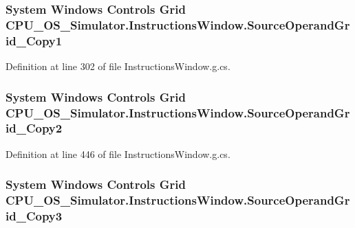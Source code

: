\subsubsection[{Source\+Operand\+Grid\+\_\+\+Copy1}]{\setlength{\rightskip}{0pt plus 5cm}System Windows Controls Grid C\+P\+U\+\_\+\+O\+S\+\_\+\+Simulator.\+Instructions\+Window.\+Source\+Operand\+Grid\+\_\+\+Copy1\hspace{0.3cm}{\ttfamily [package]}}\label{class_c_p_u___o_s___simulator_1_1_instructions_window_a685393ff28189e8c998e2a7dc6018b32}


Definition at line 302 of file Instructions\+Window.\+g.\+cs.

\hypertarget{class_c_p_u___o_s___simulator_1_1_instructions_window_a6a57e0ae92b85cd619ef3d879ef0c628}{}
\subsubsection[{Source\+Operand\+Grid\+\_\+\+Copy2}]{\setlength{\rightskip}{0pt plus 5cm}System Windows Controls Grid C\+P\+U\+\_\+\+O\+S\+\_\+\+Simulator.\+Instructions\+Window.\+Source\+Operand\+Grid\+\_\+\+Copy2\hspace{0.3cm}{\ttfamily [package]}}\label{class_c_p_u___o_s___simulator_1_1_instructions_window_a6a57e0ae92b85cd619ef3d879ef0c628}


Definition at line 446 of file Instructions\+Window.\+g.\+cs.

\hypertarget{class_c_p_u___o_s___simulator_1_1_instructions_window_ac37123264ae139f4abc30841da21cd23}{}
\subsubsection[{Source\+Operand\+Grid\+\_\+\+Copy3}]{\setlength{\rightskip}{0pt plus 5cm}System Windows Controls Grid C\+P\+U\+\_\+\+O\+S\+\_\+\+Simulator.\+Instructions\+Window.\+Source\+Operand\+Grid\+\_\+\+Copy3\hspace{0.3cm}{\ttfamily [package]}}\label{class_c_p_u___o_s___simulator_1_1_instructions_window_ac37123264ae139f4abc30841da21cd23}


